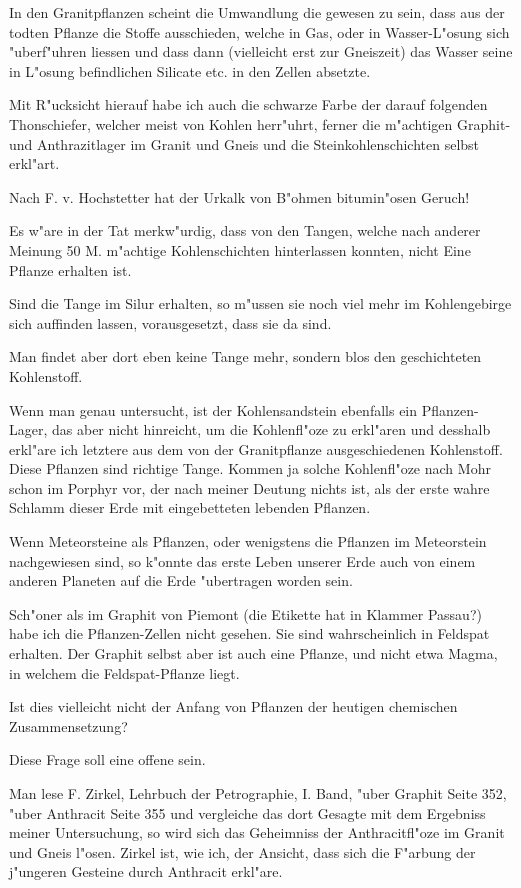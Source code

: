 \documentclass[a4paper, 11pt, oneside, german]{article}
\begin{document}
In den Granitpflanzen scheint die Umwandlung die gewesen zu sein, dass aus der todten Pflanze die Stoffe ausschieden, welche in Gas, oder in Wasser-L"osung sich "uberf"uhren liessen und dass dann (vielleicht erst zur Gneiszeit) das Wasser seine in L"osung befindlichen Silicate etc. in den Zellen absetzte.

Mit R"ucksicht hierauf habe ich auch die schwarze Farbe der darauf folgenden Thonschiefer, welcher meist von Kohlen herr"uhrt, ferner die m"achtigen Graphit- und Anthrazitlager im Granit und Gneis und die Steinkohlenschichten selbst erkl"art.

Nach F. v. Hochstetter hat der Urkalk von B"ohmen bitumin"osen Geruch!

Es w"are in der Tat merkw"urdig, dass von den Tangen, welche nach anderer Meinung 50 M. m"achtige Kohlenschichten hinterlassen konnten, nicht Eine Pflanze erhalten ist.

Sind die Tange im Silur erhalten, so m"ussen sie noch viel mehr im Kohlengebirge sich auffinden lassen, vorausgesetzt, dass sie da sind.

Man findet aber dort eben keine Tange mehr, sondern blos den geschichteten Kohlenstoff.

Wenn man genau untersucht, ist der Kohlensandstein ebenfalls ein Pflanzen-Lager, das aber nicht hinreicht, um die Kohlenfl"oze zu erkl"aren und desshalb erkl"are ich letztere aus dem von der Granitpflanze ausgeschiedenen Kohlenstoff. Diese Pflanzen sind richtige Tange. Kommen ja solche Kohlenfl"oze nach Mohr schon im Porphyr vor, der nach meiner Deutung nichts ist, als der erste wahre Schlamm dieser Erde mit eingebetteten lebenden Pflanzen.

Wenn Meteorsteine als Pflanzen, oder wenigstens die Pflanzen im Meteorstein nachgewiesen sind, so k"onnte das erste Leben unserer Erde auch von einem anderen Planeten auf die Erde "ubertragen worden sein.

Sch"oner als im Graphit von Piemont (die Etikette hat in Klammer Passau?) habe ich die Pflanzen-Zellen nicht gesehen. Sie sind wahrscheinlich in Feldspat erhalten. Der Graphit selbst aber ist auch eine Pflanze, und nicht etwa Magma, in welchem die Feldspat-Pflanze liegt.

Ist dies vielleicht nicht der Anfang von Pflanzen der heutigen chemischen Zusammensetzung?

Diese Frage soll eine offene sein.

Man lese F. Zirkel, Lehrbuch der Petrographie, I. Band, "uber Graphit Seite 352, "uber Anthracit Seite 355 und vergleiche das dort Gesagte mit dem Ergebniss meiner Untersuchung, so wird sich das Geheimniss der Anthracitfl"oze im Granit und Gneis l"osen. Zirkel ist, wie ich, der Ansicht, dass sich die F"arbung der j"ungeren Gesteine durch Anthracit erkl"are.
\end{document}
